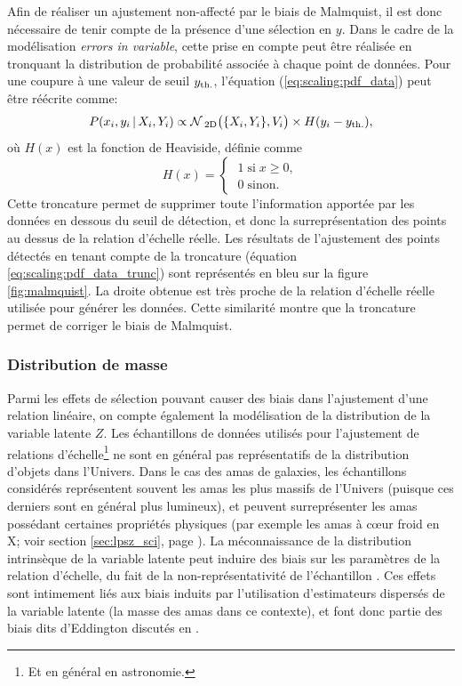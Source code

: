 Afin de réaliser un ajustement non-affecté par le biais de Malmquist, il est donc nécessaire de tenir compte de la présence d'une sélection en $y$.
Dans le cadre de la modélisation \textit{errors in variable}, cette prise en compte peut être réalisée en tronquant la distribution de probabilité associée à chaque point de données.
Pour une coupure à une valeur de seuil $y_{\rm th.}$, l'équation (\ref{eq:scaling:pdf_data}) peut être réécrite comme:
\begin{equation}
    \label{eq:scaling:pdf_data_trunc}
    P(x_i, y_i \,|\, X_i, Y_i) \propto \mathcal{N}\,_{\rm 2D}\big(\{X_i, Y_i\}, V_i\big) \times H(y_i - y_{\rm th.}),
\end{equation}
où $H(x)$ est la fonction de Heaviside, définie comme
\begin{equation}
    H(x) =
        \begin{cases}
            \; 1 \;\text{si}\; x \geqslant 0, \\
            \; 0 \;\text{sinon.}
        \end{cases}
\end{equation}
Cette troncature permet de supprimer toute l'information apportée par les données en dessous du seuil de détection, et donc la surreprésentation des points au dessus de la relation d'échelle réelle.
Les résultats de l'ajustement des points détectés en tenant compte de la troncature (équation \ref{eq:scaling:pdf_data_trunc}) sont représentés en bleu sur la figure \ref{fig:malmquist}.
La droite obtenue est très proche de la relation d'échelle réelle utilisée pour générer les données.
Cette similarité montre que la troncature permet de corriger le biais de Malmquist.

\subsubsection{Distribution de masse} %

Parmi les effets de sélection pouvant causer des biais dans l'ajustement d'une relation linéaire, on compte également la modélisation de la distribution de la variable latente $Z$.
Les échantillons de données utilisés pour l'ajustement de relations d'échelle\footnote{Et en général en astronomie.} ne sont en général pas représentatifs de la distribution d'objets dans l'Univers.
Dans le cas des amas de galaxies, les échantillons considérés représentent souvent les amas les plus massifs de l'Univers (puisque ces derniers sont en général plus lumineux), et peuvent surreprésenter les amas possédant certaines propriétés physiques (par exemple les amas à cœur froid en X; voir section \ref{sec:lpsz_sci}, page \pageref{sec:lpsz_sci}).
La méconnaissance de la distribution intrinsèque de la variable latente peut induire des biais sur les paramètres de la relation d'échelle, du fait de la non-représentativité de l'échantillon \cite{kelly_aspects_2007}.
Ces effets sont intimement liés aux biais induits par l'utilisation d'estimateurs dispersés de la variable latente (la masse des amas dans ce contexte), et font donc partie des biais dits d'Eddington discutés en  \cite{eddington_formula_1913,eddington_correction_1940}.

